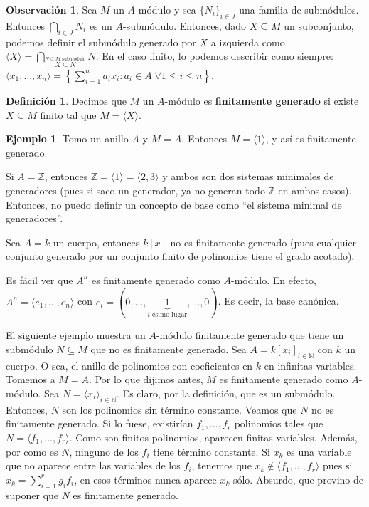 \documentclass[12pt]{book}
\theoremstyle{definition}
\newtheorem{obs}[teo]{Observación}
\newtheorem{defn}[teo]{Definición}
\newtheorem{ex}[teo]{Ejemplo}
\newcommand{\ZZ}{\mathbb{Z}}      %
\newcommand{\NN}{\mathbb{N}}
\begin{document}
\begin{obs}
Sea $M$ un $A$-módulo y sea $\{N_i\}_{i\in J}$ una familia de submódulos. Entonces $\displaystyle\bigcap_{i\in J}N_i$ es un $A$-submódulo. Entonces, dado $X\subseteq M$ un subconjunto, podemos definir el submódulo generado por $X$ a izquierda como $\langle X\rangle  = \displaystyle\bigcap_{\stackrel{N\subseteq M \text{ submódulo}}{X\subseteq N}}N$. En el caso finito, lo podemos describir como siempre: $\langle x_1,\ldots , x_n\rangle = \left\{\displaystyle\sum_{i=1}^{n} a_ix_i : a_i\in A \; \forall 1\leq i\leq n\right\}$.
\end{obs}

\begin{defn}
Decimos que $M$ un $A$-módulo es \textbf{finitamente generado} si existe $X\subseteq M$ finito tal que $M=\langle X\rangle$.
\end{defn}
\begin{ex}
Tomo un anillo $A$ y $M=A$. Entonces $M=\langle 1\rangle$, y así es finitamente generado.

Si $A=\ZZ$, entonces $\ZZ = \langle 1\rangle  =\langle 2,3\rangle$ y ambos son dos sistemas minimales de generadores (pues si saco un generador, ya no generan todo $\ZZ$ en ambos casos). Entonces, no puedo definir un concepto de base como "`el sistema minimal de generadores"'.

Sea $A=k$ un cuerpo, entonces $k[x]$ no es finitamente generado (pues cualquier conjunto generado por un conjunto finito de polinomios tiene el grado acotado).

Es fácil ver que $A^n$ es finitamente generado como $A$-módulo. En efecto, $A^n = \langle e_1, \ldots , e_n\rangle$ con $e_i = (0,\ldots , \underbrace{1}_{i\text{-ésimo lugar}} , \ldots , 0)$. Es decir, la base canónica.

El siguiente ejemplo muestra un $A$-módulo finitamente generado que tiene un submódulo $N\subseteq M$ que no es finitamente generado. Sea $A=k[x_i]_{i\in\NN}$ con $k$ un cuerpo. O sea, el anillo de polinomios con coeficientes en $k$ en infinitas variables. Tomemos a $M=A$. Por lo que dijimos antes, $M$ es finitamente generado como $A$-módulo.
Sea $N=\langle x_i\rangle_{i\in\NN}$. Es claro, por la definición, que es un submódulo. Entonces, $N$ son los polinomios sin término constante. Veamos que $N$ no es finitamente generado. Si lo fuese, existirían $f_1,\ldots , f_r$ polinomios tales que $N=\langle f_1,\ldots , f_r\rangle$. Como son finitos polinomios, aparecen finitas variables. Además, por como es $N$, ninguno de los $f_i$ tiene término constante. Si $x_k$ es una variable que no aparece entre las variables de los $f_i$, tenemos que $x_k\notin \langle f_1,\ldots , f_r\rangle$ pues si $x_k=\displaystyle\sum_{i=1}^r g_i f_i$, en esos términos nunca aparece $x_k$ sólo. Absurdo, que provino de suponer que $N$ es finitamente generado.
\end{ex}
\end{document}
